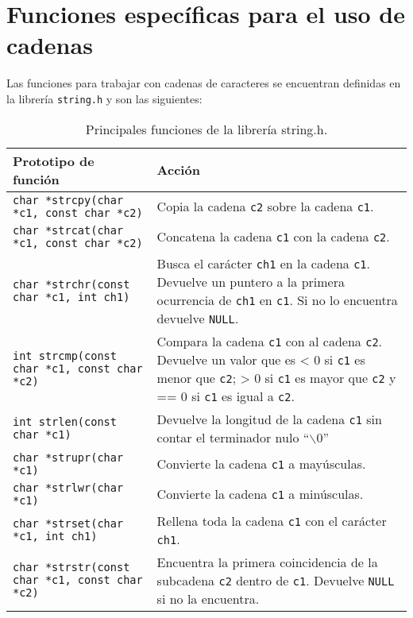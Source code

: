 \section{Funciones específicas para el uso de cadenas}
Las funciones para trabajar con cadenas de caracteres se encuentran definidas en la librería \texttt{string.h} y son las siguientes:
\newpage
\begin{table}[htbp]
	\begin{center}
		\begin{tabular}{|p{} | p{}|}
			\hline 
			\textbf{Prototipo de función} & \textbf{Acción}  \\
			\hline
			\texttt{char *strcpy(char *c1, const char *c2)} & Copia la cadena \texttt{c2} sobre la cadena \texttt{c1}.\\ \hline
			\texttt{char *strcat(char *c1, const char *c2)} & Concatena la cadena \texttt{c1} con la cadena \texttt{c2}.\\ \hline
			\texttt{char *strchr(const char *c1, int ch1)} & Busca el carácter \texttt{ch1} en la cadena \texttt{c1}. Devuelve un puntero a la primera ocurrencia de \texttt{ch1} en \texttt{c1}. Si no lo encuentra devuelve \texttt{NULL}.\\ \hline
			\texttt{int strcmp(const char *c1, const char *c2)} & Compara la cadena \texttt{c1} con al cadena \texttt{c2}. Devuelve un valor que es < 0 si \texttt{c1} es menor que \texttt{c2}; > 0 si \texttt{c1} es mayor que \texttt{c2} y == 0 si \texttt{c1} es igual a \texttt{c2}.\\ \hline
			\texttt{int strlen(const char *c1)} & Devuelve la longitud de la cadena \texttt{c1} sin contar el terminador nulo ``$\backslash{0}$''\\ \hline
			\texttt{char *strupr(char *c1)} & Convierte la cadena \texttt{c1} a mayúsculas.\\ \hline	
			\texttt{char *strlwr(char *c1)} & Convierte la cadena \texttt{c1} a minúsculas.\\ \hline
			\texttt{char *strset(char *c1, int ch1)} & Rellena toda la cadena \texttt{c1} con el carácter \texttt{ch1}.\\ \hline
			\texttt{char *strstr(const char *c1, const char *c2)} & Encuentra la primera coincidencia de la subcadena \texttt{c2} dentro de \texttt{c1}. Devuelve \texttt{NULL} si no la encuentra.\\ \hline
		\end{tabular}
		\caption{Principales funciones de la librería string.h.}
		\label{tabla:Principales funciones de la librería string.h}
	\end{center}
\end{table}
